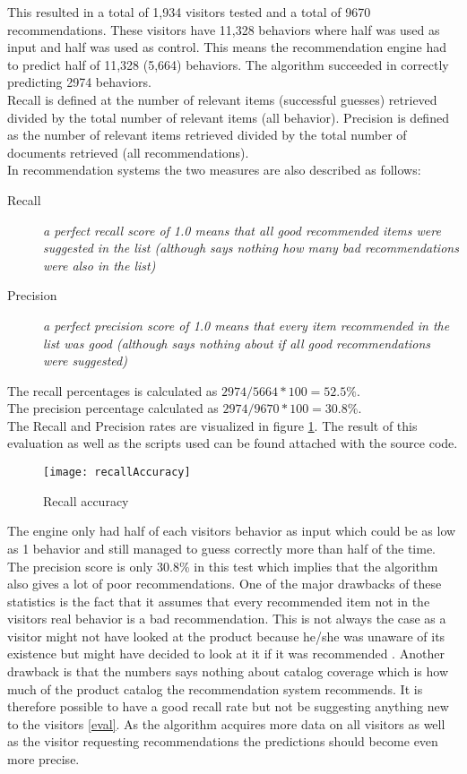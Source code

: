 This resulted in a total of 1,934 visitors tested and a total of 9670 recommendations. These visitors have 11,328 behaviors where half was used as input and half was used as control. This means the recommendation engine had to predict half of 11,328 (5,664) behaviors. The algorithm succeeded in correctly predicting 2974 behaviors.  \\
Recall is defined at the number of relevant items (successful guesses) retrieved divided by the total number of relevant items (all behavior). Precision is defined as the number of relevant items retrieved divided by the total number of documents retrieved (all recommendations). \\ In recommendation systems the two measures are also described as follows: 
\begin{description}
\item [Recall] \textit{a perfect recall score of 1.0 means that all good recommended items were suggested in the list (although says nothing how many bad recommendations were also in the list)} \cite{recallAndPrecision}
\item [Precision] \textit{a perfect precision score of 1.0 means that every item recommended in the list was good (although says nothing about if all good recommendations were suggested)} \cite{recallAndPrecision}
\end{description}
The recall percentages is calculated as \begin{math}2974/5664*100=52.5\%\end{math}. \\ The precision percentage calculated as \begin{math}2974/9670*100=30.8\%\end{math}. \\
The Recall and Precision rates are visualized in figure \ref{recallAccuracy}. The result of this evaluation as well as the scripts used can be found attached with the source code. \\
\begin{figure}[H]
\centering
\texttt{[image: recallAccuracy]}
\caption{Recall accuracy}
\label{recallAccuracy}
\end{figure}
The engine only had half of each visitors behavior as input which could be as low as 1 behavior and still managed to guess correctly more than half of the time.
The precision score is only 30.8\% in this test which implies that the algorithm also gives a lot of poor recommendations. One of the major drawbacks of these statistics is the fact that it assumes that every recommended item not in the visitors real behavior is a bad recommendation. This is not always the case as a visitor might not have looked at the product because he/she was unaware of its existence but might have decided to look at it if it was recommended \cite{evaluatingRecommender}. Another drawback is that the numbers says nothing about catalog coverage which is how much of the product catalog the recommendation system recommends. It is therefore possible to have a good recall rate but not be suggesting anything new to the visitors \ref{eval}.
As the algorithm acquires more data on all visitors as well as the visitor requesting recommendations the predictions should become even more precise.

